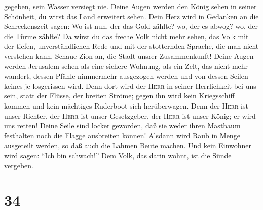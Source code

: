 gegeben, sein Wasser versiegt nie.  Deine Augen werden
den König sehen in seiner Schönheit, du wirst das Land erweitert sehen.
 Dein Herz wird in Gedanken an die Schreckenszeit sagen:
Wo ist nun, der das Gold zählte? wo, der es abwog? wo, der die Türme
zählte?  Da wirst du das freche Volk nicht mehr sehen,
das Volk mit der tiefen, unverständlichen Rede und mit der stotternden
Sprache, die man nicht verstehen kann.  Schaue Zion an,
die Stadt unsrer Zusammenkunft! Deine Augen werden Jerusalem sehen als
eine sichere Wohnung, als ein Zelt, das nicht mehr wandert, dessen
Pfähle nimmermehr ausgezogen werden und von dessen Seilen keines je
losgerissen wird.  Denn dort wird der \textsc{Herr} in
seiner Herrlichkeit bei uns sein, statt der Flüsse, der breiten Ströme;
gegen ihn wird kein Kriegsschiff kommen und kein mächtiges Ruderboot
sich herüberwagen.  Denn der \textsc{Herr} ist unser
Richter, der \textsc{Herr} ist unser Gesetzgeber, der \textsc{Herr} ist
unser König; er wird uns retten!  Deine Seile sind locker
geworden, daß sie weder ihren Mastbaum festhalten noch die Flagge
ausbreiten können! Alsdann wird Raub in Menge ausgeteilt werden, so daß
auch die Lahmen Beute machen.  Und kein Einwohner wird
sagen: ``Ich bin schwach!'' Dem Volk, das darin wohnt, ist die Sünde
vergeben.

\hypertarget{section-33}{%
\section{34}\label{section-33}}

